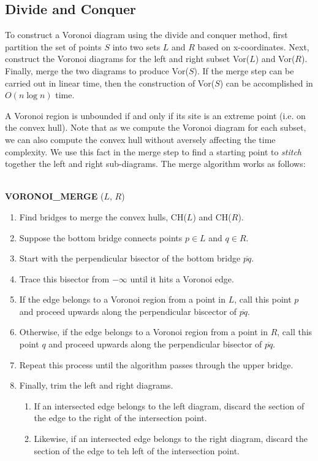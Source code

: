 \documentclass[10pt]{article}
\begin{document}
\subsection{Divide and Conquer}

To construct a Voronoi diagram using the divide and conquer method,
first partition the set of points $S$ into two sets $L$ and $R$ based
on x-coordinates.  Next, construct the Voronoi diagrams for the left
and right subset Vor($L$) and Vor($R$).  Finally, merge the two
diagrams to produce Vor($S$).  If the merge step can be carried out in
linear time, then the construction of Vor($S$) can be accomplished in
$O(n \log n)$ time.


A Voronoi region is unbounded if and only if its site is an extreme
point (i.e. on the convex hull).  Note that as we compute the Voronoi
diagram for each subset, we can also compute the convex hull without
aversely affecting the time complexity.  We use this fact in the merge
step to find a starting point to {\em stitch} together the left and
right sub-diagrams. The merge algorithm works as follows:

\parbox{4.5in}{
\hrulefill \\
{\bf VORONOI\_MERGE} ($L$, $R$)
\begin{enumerate}

\item Find bridges to merge the convex hulls, CH($L$) and CH($R$).

\item Suppose the bottom bridge connects points $p \in L$ and $q \in
R$.
 \item Start with the perpendicular bisector of the bottom bridge
$\overline{pq}$.

\item Trace this bisector from $-\infty$ until it hits a Voronoi edge.

\item If the edge belongs to a Voronoi region from a point in $L$,
call this point $p$ and proceed upwards along the perpendicular
biscector of $\overline{pq}$.

\item Otherwise, if the edge belongs to a Voronoi region from a point
in $R$, call this point $q$ and proceed upwards along the
perpendicular bisector of $\overline{pq}$.

\item Repeat this process until the algorithm passes through the upper
bridge.

\item Finally, trim the left and right diagrams.
\begin{enumerate}
\item If an intersected edge belongs to the left diagram, discard the
section of the edge to the right of the intersection point. 
\item Likewise, if an intersected edge belongs to the right diagram, 
discard the section of the edge to teh left of the intersection point.
\end{enumerate}
\end{enumerate}
\hrulefill}
\end{document}
